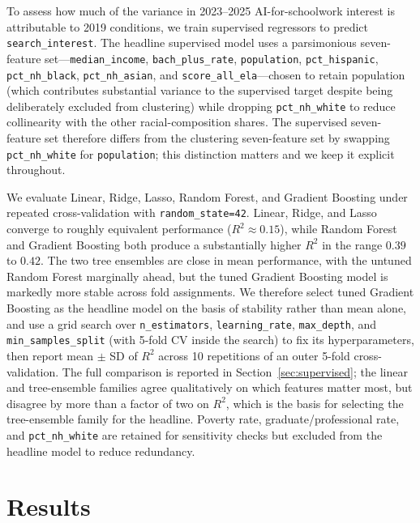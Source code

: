 \documentclass[11pt]{article}
\begin{document}
To assess how much of the variance in 2023--2025 AI-for-schoolwork interest is attributable to 2019 conditions, we train supervised regressors to predict \texttt{search\_interest}. The headline supervised model uses a parsimonious seven-feature set---\texttt{median\_income}, \texttt{bach\_plus\_rate}, \texttt{population}, \texttt{pct\_hispanic}, \texttt{pct\_nh\_black}, \texttt{pct\_nh\_asian}, and \texttt{score\_all\_ela}---chosen to retain population (which contributes substantial variance to the supervised target despite being deliberately excluded from clustering) while dropping \texttt{pct\_nh\_white} to reduce collinearity with the other racial-composition shares. The supervised seven-feature set therefore differs from the clustering seven-feature set by swapping \texttt{pct\_nh\_white} for \texttt{population}; this distinction matters and we keep it explicit throughout.

We evaluate Linear, Ridge, Lasso, Random Forest, and Gradient Boosting under repeated cross-validation with \texttt{random\_state=42}. Linear, Ridge, and Lasso converge to roughly equivalent performance ($R^2 \approx 0.15$), while Random Forest and Gradient Boosting both produce a substantially higher $R^2$ in the range $0.39$ to $0.42$. The two tree ensembles are close in mean performance, with the untuned Random Forest marginally ahead, but the tuned Gradient Boosting model is markedly more stable across fold assignments. We therefore select tuned Gradient Boosting as the headline model on the basis of stability rather than mean alone, and use a grid search over \texttt{n\_estimators}, \texttt{learning\_rate}, \texttt{max\_depth}, and \texttt{min\_samples\_split} (with 5-fold CV inside the search) to fix its hyperparameters, then report mean $\pm$ SD of $R^2$ across 10 repetitions of an outer 5-fold cross-validation. The full comparison is reported in Section~\ref{sec:supervised}; the linear and tree-ensemble families agree qualitatively on which features matter most, but disagree by more than a factor of two on $R^2$, which is the basis for selecting the tree-ensemble family for the headline. Poverty rate, graduate/professional rate, and \texttt{pct\_nh\_white} are retained for sensitivity checks but excluded from the headline model to reduce redundancy.

\section{Results}
\label{sec:results}
\end{document}
